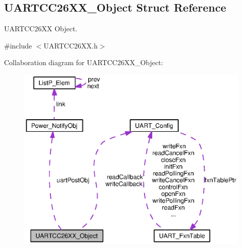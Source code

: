 \subsection{U\+A\+R\+T\+C\+C26\+X\+X\+\_\+\+Object Struct Reference}
\label{struct_u_a_r_t_c_c26_x_x___object}


U\+A\+R\+T\+C\+C26\+X\+X Object.  




{\ttfamily \#include $<$U\+A\+R\+T\+C\+C26\+X\+X.\+h$>$}



Collaboration diagram for U\+A\+R\+T\+C\+C26\+X\+X\+\_\+\+Object\+:
\nopagebreak
\begin{figure}[H]
\begin{center}
\leavevmode
\includegraphics[width=350pt]{struct_u_a_r_t_c_c26_x_x___object__coll__graph}
\end{center}
\end{figure}
